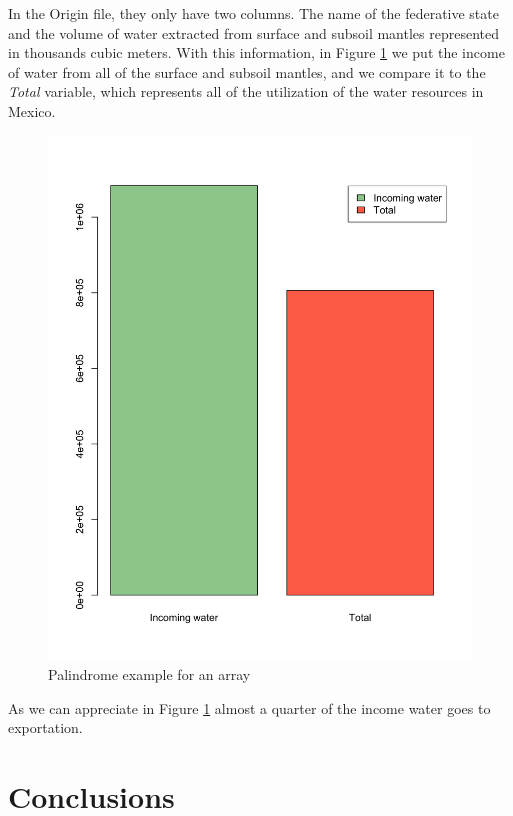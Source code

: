 \documentclass{article}
\begin{document}
In the Origin file, they only have two columns. The name of the federative state and the volume of water extracted from surface and subsoil mantles represented in thousands cubic meters. With this information, in Figure \ref{fig4} we put the income of water from all of the surface and subsoil mantles, and we compare it to the \textit{Total} variable, which represents all of the utilization of the water resources in Mexico.\\

\begin{figure}[htp]
	\centering
	\includegraphics[width=\linewidth]{histo2.png}
	\caption{Palindrome example for an array}\label{fig4}
\end{figure}
\clearpage

As we can appreciate in Figure \ref{fig4} almost a quarter of the income water goes to exportation.\\

\section{Conclusions}
\end{document}
